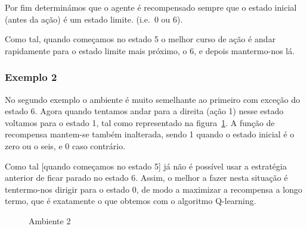 \documentclass[a4paper,twocolumn]{article}
\begin{document}
    Por fim determinámos que o agente é recompensado sempre que o estado
    inicial (antes da ação) é um estado limite. (i.e.~0 ou 6).

    Como tal, quando começamos no estado 5 o melhor curso de ação é andar rapidamente
    para o estado limite mais próximo, o 6, e depois mantermo-nos lá.

    \subsubsection{Exemplo 2}
    No segundo exemplo o ambiente é muito semelhante ao primeiro com exceção do estado 6. Agora quando
    tentamos andar para a direita (ação 1) nesse estado voltamos para o estado 1, tal como representado na figura~\ref{fig:amb2}.
    A função de recompensa mantem-se também inalterada, sendo 1 quando o estado inicial é o zero ou o seis, e
    0 caso contrário.

    Como tal [quando começamos no estado 5] já não é possível usar a estratégia anterior de ficar parado no estado 6.
    Assim, o melhor a fazer nesta situação é tentermo-nos dirigir para o estado 0, de modo a maximizar a recompensa a
    longo termo, que é exatamente o que obtemos com o algoritmo Q-learning.

    \begin{figure}
        \centering
        \caption{Ambiente 2} \label{fig:amb2}
    \end{figure}
\end{document}
